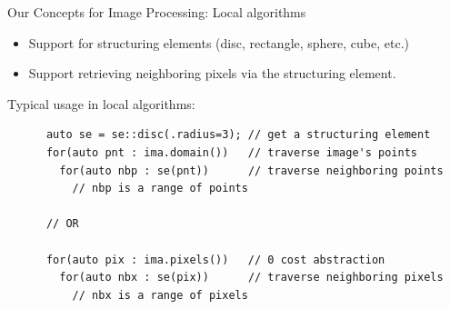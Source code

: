 \documentclass[12pt,aspectratio=169]{beamer}
\begin{document}
\begin{frame}[fragile]{Our Concepts for Image Processing: Local algorithms}
  \begin{itemize}
    \item Support for structuring elements (disc, rectangle, sphere, cube, etc.)
    \item Support retrieving neighboring pixels via the structuring element.
  \end{itemize}
  Typical usage in local algorithms:
  
  \begin{verbatim}
      auto se = se::disc(.radius=3); // get a structuring element
      for(auto pnt : ima.domain())   // traverse image's points
        for(auto nbp : se(pnt))      // traverse neighboring points
          // nbp is a range of points

      // OR

      for(auto pix : ima.pixels())   // 0 cost abstraction
        for(auto nbx : se(pix))      // traverse neighboring pixels
          // nbx is a range of pixels
  \end{verbatim}
  \pdfcomment[icon=Note]{   }
\end{frame}
\end{document}
